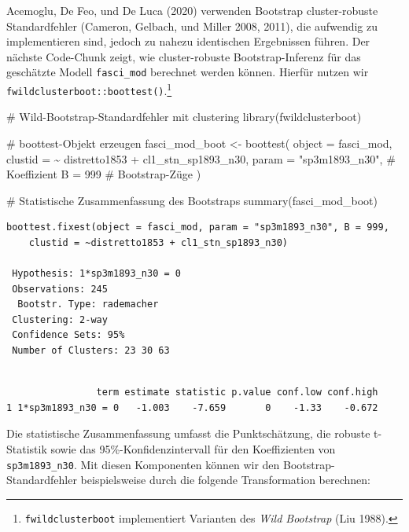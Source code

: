 \documentclass[
  a4paper,
  DIV=11,
  oneside]{scrreprt}
\newenvironment{Shaded}{\begin{snugshade}}{\end{snugshade}}
\newcommand{\AttributeTok}[1]{\textcolor[rgb]{0.40,0.45,0.13}{#1}}
\newcommand{\CommentTok}[1]{\textcolor[rgb]{0.37,0.37,0.37}{#1}}
\newcommand{\DecValTok}[1]{\textcolor[rgb]{0.68,0.00,0.00}{#1}}
\newcommand{\FunctionTok}[1]{\textcolor[rgb]{0.28,0.35,0.67}{#1}}
\newcommand{\NormalTok}[1]{\textcolor[rgb]{0.00,0.23,0.31}{#1}}
\newcommand{\OtherTok}[1]{\textcolor[rgb]{0.00,0.23,0.31}{#1}}
\newcommand{\SpecialCharTok}[1]{\textcolor[rgb]{0.37,0.37,0.37}{#1}}
\newcommand{\StringTok}[1]{\textcolor[rgb]{0.13,0.47,0.30}{#1}}
\begin{document}
Acemoglu, De Feo, und De Luca (2020) verwenden Bootstrap cluster-robuste
Standardfehler (Cameron, Gelbach, und Miller 2008, 2011), die aufwendig
zu implementieren sind, jedoch zu nahezu identischen Ergebnissen führen.
Der nächste Code-Chunk zeigt, wie cluster-robuste Bootstrap-Inferenz für
das geschätzte Modell \texttt{fasci\_mod} berechnet werden können.
Hierfür nutzen wir \texttt{fwildclusterboot::boottest()}.\footnote{\texttt{fwildclusterboot}
  implementiert Varianten des \emph{Wild Bootstrap} (Liu 1988).}

\begin{Shaded}
\begin{Highlighting}[]
\CommentTok{\# Wild{-}Bootstrap{-}Standardfehler mit clustering}
\FunctionTok{library}\NormalTok{(fwildclusterboot)}

\CommentTok{\# boottest{-}Objekt erzeugen}
\NormalTok{fasci\_mod\_boot }\OtherTok{\textless{}{-}} \FunctionTok{boottest}\NormalTok{(}
  \AttributeTok{object =}\NormalTok{ fasci\_mod, }
  \AttributeTok{clustid =} \SpecialCharTok{\textasciitilde{}}\NormalTok{ distretto1853 }\SpecialCharTok{+}\NormalTok{ cl1\_stn\_sp1893\_n30,}
  \AttributeTok{param =} \StringTok{"sp3m1893\_n30"}\NormalTok{, }\CommentTok{\# Koeffizient}
  \AttributeTok{B =} \DecValTok{999} \CommentTok{\# Bootstrap{-}Züge}
\NormalTok{)}

\CommentTok{\# Statistische Zusammenfassung des Bootstraps}
\FunctionTok{summary}\NormalTok{(fasci\_mod\_boot)}
\end{Highlighting}
\end{Shaded}

\begin{verbatim}
boottest.fixest(object = fasci_mod, param = "sp3m1893_n30", B = 999, 
    clustid = ~distretto1853 + cl1_stn_sp1893_n30)
    
 Hypothesis: 1*sp3m1893_n30 = 0
 Observations: 245
  Bootstr. Type: rademacher
 Clustering: 2-way
 Confidence Sets: 95%
 Number of Clusters: 23 30 63
 
\end{verbatim}

\begin{verbatim}
                term estimate statistic p.value conf.low conf.high
1 1*sp3m1893_n30 = 0   -1.003    -7.659       0    -1.33    -0.672
\end{verbatim}

Die statistische Zusammenfassung umfasst die Punktschätzung, die robuste
t-Statistik sowie das 95\%-Konfidenzintervall für den Koeffizienten von
\texttt{sp3m1893\_n30}. Mit diesen Komponenten können wir den
Bootstrap-Standardfehler beispielsweise durch die folgende
Transformation berechnen:
\end{document}
